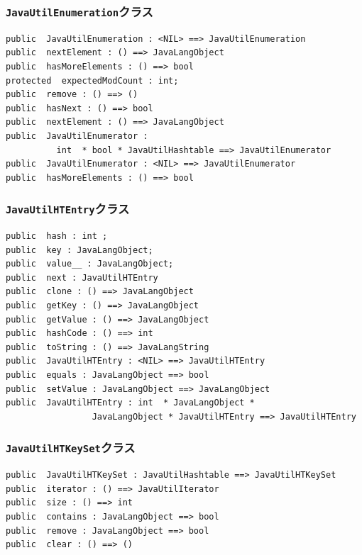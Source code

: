 \documentclass[\pformat,12pt]{jarticle}
\begin{document}
\subsubsection{\texttt{JavaUtilEnumeration}クラス}
\begin{small}
\begin{verbatim}
public  JavaUtilEnumeration : <NIL> ==> JavaUtilEnumeration
public  nextElement : () ==> JavaLangObject
public  hasMoreElements : () ==> bool
protected  expectedModCount : int;
public  remove : () ==> ()
public  hasNext : () ==> bool
public  nextElement : () ==> JavaLangObject
public  JavaUtilEnumerator : 
          int  * bool * JavaUtilHashtable ==> JavaUtilEnumerator
public  JavaUtilEnumerator : <NIL> ==> JavaUtilEnumerator
public  hasMoreElements : () ==> bool
\end{verbatim}
\end{small}

\subsubsection{\texttt{JavaUtilHTEntry}クラス}
\begin{small}
\begin{verbatim}
public  hash : int ;
public  key : JavaLangObject;
public  value__ : JavaLangObject;
public  next : JavaUtilHTEntry
public  clone : () ==> JavaLangObject
public  getKey : () ==> JavaLangObject
public  getValue : () ==> JavaLangObject
public  hashCode : () ==> int
public  toString : () ==> JavaLangString
public  JavaUtilHTEntry : <NIL> ==> JavaUtilHTEntry
public  equals : JavaLangObject ==> bool
public  setValue : JavaLangObject ==> JavaLangObject
public  JavaUtilHTEntry : int  * JavaLangObject * 
                 JavaLangObject * JavaUtilHTEntry ==> JavaUtilHTEntry
\end{verbatim}
\end{small}

\subsubsection{\texttt{JavaUtilHTKeySet}クラス}
\begin{small}
\begin{verbatim}
public  JavaUtilHTKeySet : JavaUtilHashtable ==> JavaUtilHTKeySet
public  iterator : () ==> JavaUtilIterator
public  size : () ==> int
public  contains : JavaLangObject ==> bool
public  remove : JavaLangObject ==> bool
public  clear : () ==> ()
\end{verbatim}
\end{small}
\end{document}
